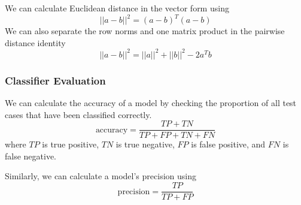 We can calculate Euclidean distance in the vector form using
\begin{equation}
    ||a-b||^2 = (a-b)^T(a-b)
\end{equation}
We can also separate the row norms and one matrix product in the pairwise distance identity
\begin{equation}
    ||a-b||^2 = ||a||^2 + ||b||^2 - 2a^Tb
\end{equation}



\subsubsection{Classifier Evaluation}

We can calculate the accuracy of a model by checking the proportion of all test cases that have been classified correctly.
\begin{equation}
    \text{accuracy} = \frac{TP + TN}{TP + FP + TN + FN}
\end{equation}
where \(TP\) is true positive, \(TN\) is true negative, \(FP\) is false positive, and \(FN\) is false negative.

Similarly, we can calculate a model's precision using
\begin{equation}
    \text{precision} = \frac{TP}{TP + FP}
\end{equation}

